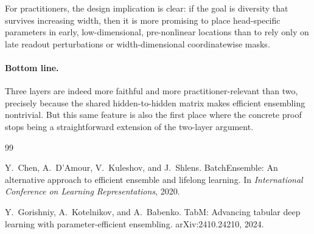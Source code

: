 \documentclass{article}
\theoremstyle{definition}
\begin{document}
For practitioners, the design implication is clear: if the goal is diversity
that survives increasing width, then it is more promising to place head-specific
parameters in early, low-dimensional, pre-nonlinear locations than to rely only
on late readout perturbations or width-dimensional coordinatewise masks.

\paragraph{Bottom line.}
Three layers are indeed more faithful and more practitioner-relevant than two, precisely because the shared hidden-to-hidden matrix makes efficient ensembling nontrivial. But this same feature is also the first place where the concrete proof stops being a straightforward extension of the two-layer argument.

\begin{thebibliography}{99}

Y.~Chen, A.~D'Amour, V.~Kuleshov, and J.~Shlens.
\newblock BatchEnsemble: An alternative approach to efficient ensemble and lifelong learning.
\newblock In \emph{International Conference on Learning Representations}, 2020.

Y.~Gorishniy, A.~Kotelnikov, and A.~Babenko.
\newblock TabM: Advancing tabular deep learning with parameter-efficient ensembling.
\newblock arXiv:2410.24210, 2024.

\end{thebibliography}
\end{document}
